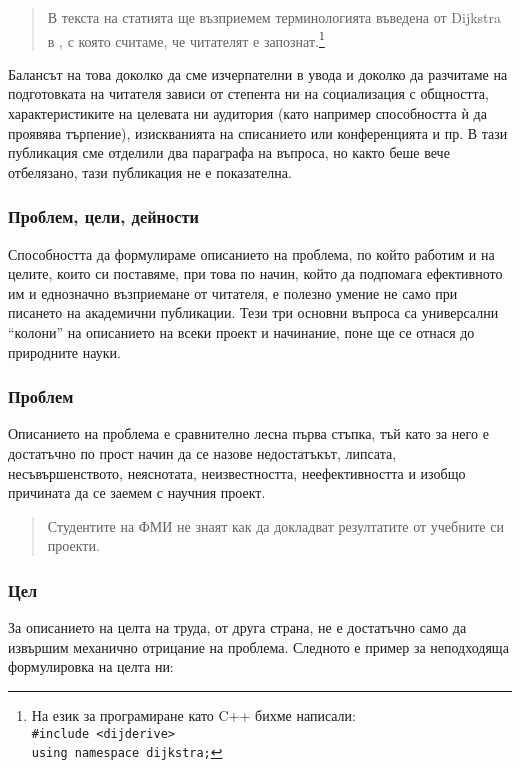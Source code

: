 \documentclass[11pt, oneside]{article}     %
\begin{document}
\begin{quote}
  В текста на статията ще възприемем терминологията въведена от Dijkstra в \cite{dijderive}, с която считаме, че читателят е запознат.\footnote{На език за програмиране като C++ бихме написали:\\
\texttt{\#include <dijderive>}\\
\texttt{using namespace dijkstra;}}
\end{quote}

Балансът на това доколко да сме изчерпателни в увода и доколко да разчитаме на подготовката на читателя зависи от степента ни на социализация с общността, характеристиките на целевата ни аудитория (като например способността ѝ да проявява търпение), изискванията на списанието или конференцията и пр. В тази публикация сме отделили два параграфа на въпроса, но както беше вече отбелязано, тази публикация не е показателна.

\subsubsection*{Проблем, цели, дейности}

Способността да формулираме описанието на проблема, по който работим и на целите, които си поставяме, при това по начин, който да подпомага ефективното им и еднозначно възприемане от читателя, е полезно умение не само при писането на академични публикации. Тези три основни въпроса са универсални ``колони'' на описанието на всеки проект и начинание, поне ще се отнася до природните науки.

\subsubsection*{Проблем}
Описанието на проблема е сравнително лесна първа стъпка, тъй като за него е достатъчно по прост начин да се назове недостатъкът, липсата, несъвършенството, неяснотата, неизвестността, неефективността и изобщо причината да се заемем с научния проект.

\begin{quote}
  Студентите на ФМИ не знаят как да докладват резултатите от учебните си проекти.
\end{quote}

\subsubsection*{Цел}
За описанието на целта на труда, от друга страна, не е достатъчно само да извършим механично отрицание на проблема. Следното е пример за неподходяща формулировка на целта ни:
\end{document}
